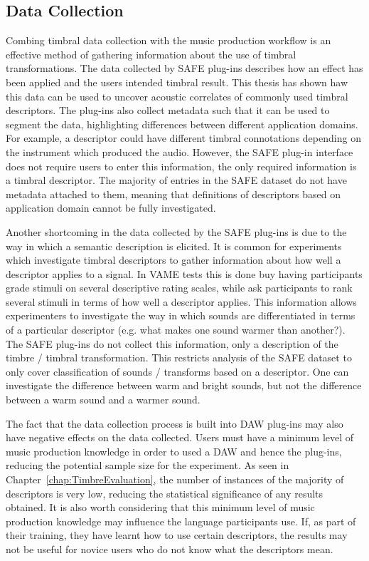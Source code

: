 	\subsection{Data Collection}
	\label{sec:Conclusion-Critique-DataCollection}
		Combing timbral data collection with the music production workflow is an effective method of gathering
		information about the use of timbral transformations. The data collected by SAFE plug-ins describes how an
		effect has been applied and the users intended timbral result. This thesis has shown haw this data can be
		used to uncover acoustic correlates of commonly used timbral descriptors. The plug-ins also collect metadata
		such that it can be used to segment the data, highlighting differences between different application
		domains. For example, a descriptor could have different timbral connotations depending on the instrument
		which produced the audio. However, the SAFE plug-in interface does not require users to enter this
		information, the only required information is a timbral descriptor. The majority of entries in the SAFE
		dataset do not have metadata attached to them, meaning that definitions of descriptors based on application
		domain cannot be fully investigated. 

		Another shortcoming in the data collected by the SAFE plug-ins is due to the way in which a semantic
		description is elicited. It is common for experiments which investigate timbral descriptors to gather
		information about how well a descriptor applies to a signal. In VAME tests this is done buy having
		participants grade stimuli on several descriptive rating scales, while \citet{cartwright2013socialeq} ask
		participants to rank several stimuli in terms of how well a descriptor applies. This information allows
		experimenters to investigate the way in which sounds are differentiated in terms of a particular descriptor
		(e.g. what makes one sound warmer than another?). The SAFE plug-ins do not collect this information, only a
		description of the timbre / timbral transformation. This restricts analysis of the SAFE dataset to only
		cover classification of sounds / transforms based on a descriptor. One can investigate the difference
		between warm and bright sounds, but not the difference between a warm sound and a warmer sound.

		The fact that the data collection process is built into DAW plug-ins may also have negative effects on the
		data collected. Users must have a minimum level of music production knowledge in order to used a DAW and
		hence the plug-ins, reducing the potential sample size for the experiment. As seen in
		Chapter~\ref{chap:TimbreEvaluation}, the number of instances of the majority of descriptors is very low,
		reducing the statistical significance of any results obtained. It is also worth considering that this
		minimum level of music production knowledge may influence the language participants use. If, as part of
		their training, they have learnt how to use certain descriptors, the results may not be useful for novice
		users who do not know what the descriptors mean.

